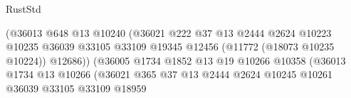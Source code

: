 \begin{lexlean}{RustStd}
\begin{coremodule}
                                                    (@36013
                                                      @648
                                                      @13
                                                      @10240
                                                      (@36021
                                                        @222
                                                        @37
                                                        @13
                                                        @2444
                                                        @2624
                                                        @10223
                                                        @10235
                                                        @36039
                                                        @33105
                                                        @33109
                                                        @19345
                                                        @12456
                                                        (@11772 (@18073 @10235 @10224))
                                                        @12686))
                                                    (@36005
                                                      @1734
                                                      @1852
                                                      @13
                                                      @19
                                                      @10266
                                                      @10358
                                                      (@36013
                                                        @1734
                                                        @13
                                                        @10266
                                                        (@36021
                                                          @365
                                                          @37
                                                          @13
                                                          @2444
                                                          @2624
                                                          @10245
                                                          @10261
                                                          @36039
                                                          @33105
                                                          @33109
                                                          @18959

\end{coremodule}
\end{lexlean}
